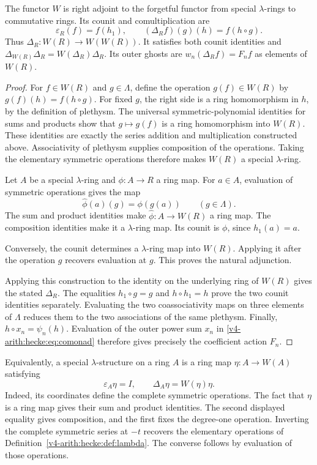 \begin{theorem}
\label{v4-arith:hecke:thm:cofree}
The functor $W$ is right adjoint to the forgetful functor
from special $\lambda$-rings to commutative rings.
Its counit and comultiplication are
\begin{equation}
 \label{v4-arith:hecke:eq:comonad}
 \varepsilon_R(f)=f(h_1),\qquad
 (\Delta_Rf)(g)(h)=f(h\circ g).
\end{equation}
Thus $\Delta_R:W(R)\to W(W(R))$.
It satisfies both counit identities and
$\Delta_{W(R)}\Delta_R=W(\Delta_R)\Delta_R$.
Its outer ghosts are $w_n(\Delta_Rf)=F_nf$ as elements of $W(R)$.
\end{theorem}
\begin{proof}
For $f\in W(R)$ and $g\in\Lambda$, define the operation
$g(f)\in W(R)$ by $g(f)(h)=f(h\circ g)$.
For fixed $g$, the right side is a ring homomorphism in $h$,
by the definition of plethysm.
The universal symmetric-polynomial identities for sums and products
show that $g\mapsto g(f)$ is a ring homomorphism into $W(R)$.
These identities are exactly the series addition and multiplication
constructed above. Associativity of plethysm supplies composition
of the operations. Taking the elementary symmetric operations
therefore makes $W(R)$ a special $\lambda$-ring.

Let $A$ be a special $\lambda$-ring and $\phi:A\to R$ a ring map.
For $a\in A$, evaluation of symmetric operations gives the map
\[
 \widehat\phi(a)(g)=\phi(g(a))\qquad(g\in\Lambda).
\]
The sum and product identities make
$\widehat\phi:A\to W(R)$ a ring map.
The composition identities make it a $\lambda$-ring map.
Its counit is $\phi$, since $h_1(a)=a$.

Conversely, the counit determines a $\lambda$-ring map into $W(R)$.
Applying it after the operation $g$ recovers evaluation at $g$.
This proves the natural adjunction.

Applying this construction to the identity on the underlying ring
of $W(R)$ gives the stated $\Delta_R$.
The equalities $h_1\circ g=g$ and $h\circ h_1=h$ prove
the two counit identities separately.
Evaluating the two coassociativity maps on three elements of $\Lambda$
reduces them to the two associations of the same plethysm.
Finally, $h\circ x_n=\psi_n(h)$.
Evaluation of the outer power sum $x_n$ in \eqref{v4-arith:hecke:eq:comonad}
therefore gives precisely the coefficient action $F_n$.
\end{proof}

Equivalently, a special $\lambda$-structure on a ring $A$ is a ring map
$\eta:A\to W(A)$ satisfying
\[
 \varepsilon_A\eta=I,
 \qquad \Delta_A\eta=W(\eta)\eta.
\]
Indeed, its coordinates define the complete symmetric operations.
The fact that $\eta$ is a ring map gives their sum and product identities.
The second displayed equality gives composition, and the first fixes
the degree-one operation. Inverting the complete symmetric series
at $-t$ recovers the elementary operations of
Definition~\ref{v4-arith:hecke:def:lambda}.
The converse follows by evaluation of those operations.

